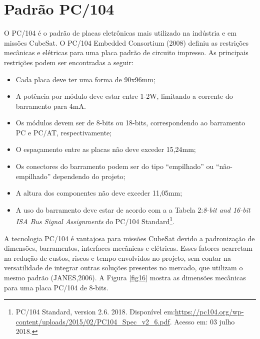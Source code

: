\section{Padrão PC/104}

O PC/104 é o padrão de placas eletrônicas mais utilizado na indústria e em missões CubeSat. O PC/104 Embedded Consortium (2008) definiu as restrições mecânicas e elétricas para uma placa padrão de circuito impresso. As principais restrições podem ser encontradas a seguir:

\begin{itemize}
\item Cada placa deve ter uma forma de 90x96mm;
\item A potência por módulo deve estar entre 1-2W, limitando a corrente do barramento para 4mA.
\item Os módulos devem ser de 8-bits ou 18-bits, correspondendo ao barramento PC e PC/AT, respectivamente;
\item O espaçamento entre as placas não deve exceder 15,24mm;
\item Os conectores do barramento podem ser do tipo “empilhado” ou “não-empilhado” dependendo do projeto;
\item A altura dos componentes não deve exceder 11,05mm;
\item A uso do barramento deve estar de acordo com a a Tabela 2:\textit{8-bit and 16-bit ISA Bus Signal Assignments} do PC/104 Standard\footnote{PC/104 Standard, version 2.6. 2018. Disponível em:\url{https://pc104.org/wp-content/uploads/2015/02/PC104_Spec_v2_6.pdf}. Acesso em: 03 julho 2018.}.

\end{itemize}

A tecnologia PC/104 é vantajosa para missões CubeSat devido a padronização de dimensões, barramentos, interfaces mecânicas e elétricas. Esses fatores acarretam na redução de custos, riscos e tempo envolvidos no projeto, sem contar na versatilidade de integrar outras soluções presentes no mercado, que utilizam o mesmo padrão (JANES,2006). A Figura \ref{fig16} mostra as dimensões mecânicas para uma placa PC/104 de 8-bits. 

